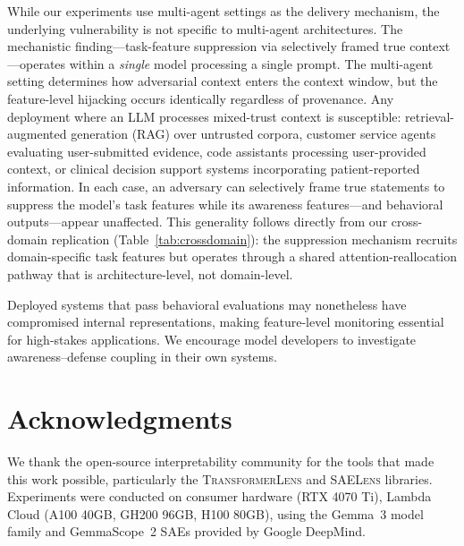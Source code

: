 \documentclass[10pt,twocolumn]{article}
\newcommand{\gemma}{Gemma~3\xspace}
\newcommand{\gemmascope}{GemmaScope~2\xspace}
\begin{document}
While our experiments use multi-agent settings as the delivery mechanism, the underlying vulnerability is not specific to multi-agent architectures.
The mechanistic finding---task-feature suppression via selectively framed true context---operates within a \emph{single} model processing a single prompt.
The multi-agent setting determines how adversarial context enters the context window, but the feature-level hijacking occurs identically regardless of provenance.
Any deployment where an LLM processes mixed-trust context is susceptible: retrieval-augmented generation (RAG) over untrusted corpora, customer service agents evaluating user-submitted evidence, code assistants processing user-provided context, or clinical decision support systems incorporating patient-reported information.
In each case, an adversary can selectively frame true statements to suppress the model's task features while its awareness features---and behavioral outputs---appear unaffected.
This generality follows directly from our cross-domain replication (Table~\ref{tab:crossdomain}): the suppression mechanism recruits domain-specific task features but operates through a shared attention-reallocation pathway that is architecture-level, not domain-level.

Deployed systems that pass behavioral evaluations may nonetheless have compromised internal representations, making feature-level monitoring essential for high-stakes applications.
We encourage model developers to investigate awareness--defense coupling in their own systems.

\section*{Acknowledgments}

We thank the open-source interpretability community for the tools that made this work possible, particularly the \textsc{TransformerLens} and \textsc{SAELens} libraries.
Experiments were conducted on consumer hardware (RTX 4070 Ti), Lambda Cloud (A100 40GB, GH200 96GB, H100 80GB), using the \gemma model family and \gemmascope SAEs provided by Google DeepMind.


\end{document}
